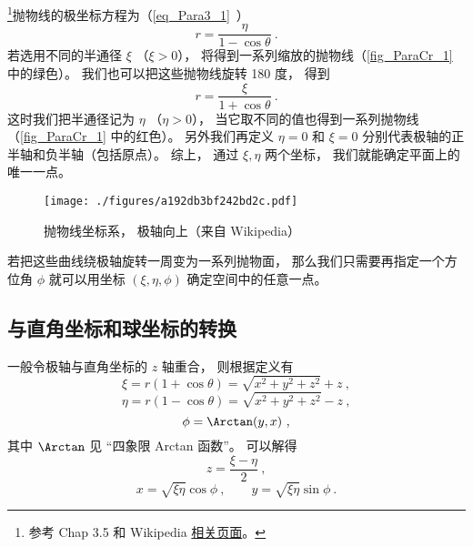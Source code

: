 

\footnote{参考 \cite{Bransden} Chap 3.5 和 Wikipedia \href{https://en.wikipedia.org/wiki/Parabolic_coordinates}{相关页面}。}抛物线的极坐标方程为（\autoref{eq_Para3_1}~）
\begin{equation}\label{eq_ParaCr_1}
r = \frac{\eta}{1 - \cos \theta }~.
\end{equation}
若选用不同的半通径 $\xi$ （$\xi > 0$）， 将得到一系列缩放的抛物线（\autoref{fig_ParaCr_1} 中的绿色）。 我们也可以把这些抛物线旋转 180 度， 得到
\begin{equation}
r = \frac{\xi}{1 + \cos \theta }~.
\end{equation}
这时我们把半通径记为 $\eta$ （$\eta > 0$）， 当它取不同的值也得到一系列抛物线（\autoref{fig_ParaCr_1} 中的红色）。 另外我们再定义 $\eta = 0$ 和 $\xi = 0$ 分别代表极轴的正半轴和负半轴（包括原点）。 综上， 通过 $\xi, \eta$ 两个坐标， 我们就能确定平面上的唯一一点。

\begin{figure}[ht]
\centering
\texttt{[image: ./figures/a192db3bf242bd2c.pdf]}
\caption{抛物线坐标系， 极轴向上（来自 Wikipedia）} \label{fig_ParaCr_1}
\end{figure}

若把这些曲线绕极轴旋转一周变为一系列抛物面， 那么我们只需要再指定一个方位角 $\phi$ 就可以用坐标 $(\xi, \eta, \phi)$ 确定空间中的任意一点。

\subsection{与直角坐标和球坐标的转换}
一般令极轴与直角坐标的 $z$ 轴重合， 则根据定义有
\begin{equation}
\xi = r(1 + \cos\theta) = \sqrt{x^2 + y^2 + z^2} + z~,
\end{equation}
\begin{equation}
\eta = r(1 - \cos\theta) = \sqrt{x^2 + y^2 + z^2} - z~,
\end{equation}
\begin{equation}
\phi = \Arctan(y, x)~,
\end{equation}
其中 $\Arctan$ 见 “四象限 Arctan 函数”。 可以解得
\begin{equation}\label{eq_ParaCr_2}
z = \frac{\xi - \eta}{2}~,
\end{equation}
\begin{equation}\label{eq_ParaCr_3}
x = \sqrt{\xi\eta}\cos\phi ~,\qquad
y = \sqrt{\xi\eta}\sin\phi~.
\end{equation}

